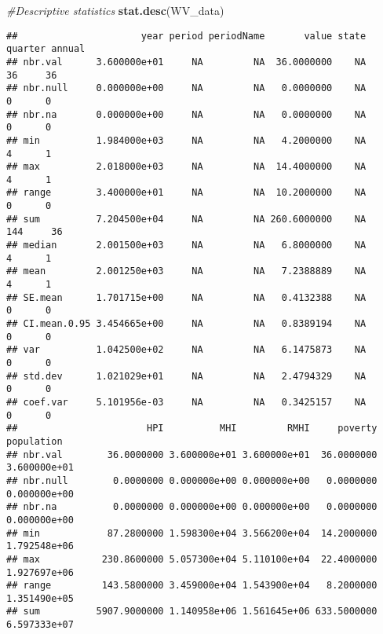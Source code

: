 \documentclass[
]{article}
\newenvironment{Shaded}{\begin{snugshade}}{\end{snugshade}}
\newcommand{\CommentTok}[1]{\textcolor[rgb]{0.56,0.35,0.01}{\textit{#1}}}
\newcommand{\KeywordTok}[1]{\textcolor[rgb]{0.13,0.29,0.53}{\textbf{#1}}}
\newcommand{\NormalTok}[1]{#1}
\newcommand{\OperatorTok}[1]{\textcolor[rgb]{0.81,0.36,0.00}{\textbf{#1}}}
\newcommand{\StringTok}[1]{\textcolor[rgb]{0.31,0.60,0.02}{#1}}
\begin{document}
\begin{Shaded}
\end{Shaded}

\begin{Shaded}
\begin{Highlighting}[]
\CommentTok{#Descriptive statistics}
\KeywordTok{stat.desc}\NormalTok{(WV_data)}
\end{Highlighting}
\end{Shaded}

\begin{verbatim}
##                      year period periodName       value state quarter annual
## nbr.val      3.600000e+01     NA         NA  36.0000000    NA      36     36
## nbr.null     0.000000e+00     NA         NA   0.0000000    NA       0      0
## nbr.na       0.000000e+00     NA         NA   0.0000000    NA       0      0
## min          1.984000e+03     NA         NA   4.2000000    NA       4      1
## max          2.018000e+03     NA         NA  14.4000000    NA       4      1
## range        3.400000e+01     NA         NA  10.2000000    NA       0      0
## sum          7.204500e+04     NA         NA 260.6000000    NA     144     36
## median       2.001500e+03     NA         NA   6.8000000    NA       4      1
## mean         2.001250e+03     NA         NA   7.2388889    NA       4      1
## SE.mean      1.701715e+00     NA         NA   0.4132388    NA       0      0
## CI.mean.0.95 3.454665e+00     NA         NA   0.8389194    NA       0      0
## var          1.042500e+02     NA         NA   6.1475873    NA       0      0
## std.dev      1.021029e+01     NA         NA   2.4794329    NA       0      0
## coef.var     5.101956e-03     NA         NA   0.3425157    NA       0      0
##                       HPI          MHI         RMHI     poverty   population
## nbr.val        36.0000000 3.600000e+01 3.600000e+01  36.0000000 3.600000e+01
## nbr.null        0.0000000 0.000000e+00 0.000000e+00   0.0000000 0.000000e+00
## nbr.na          0.0000000 0.000000e+00 0.000000e+00   0.0000000 0.000000e+00
## min            87.2800000 1.598300e+04 3.566200e+04  14.2000000 1.792548e+06
## max           230.8600000 5.057300e+04 5.110100e+04  22.4000000 1.927697e+06
## range         143.5800000 3.459000e+04 1.543900e+04   8.2000000 1.351490e+05
## sum          5907.9000000 1.140958e+06 1.561645e+06 633.5000000 6.597333e+07

\end{verbatim}
\end{document}
